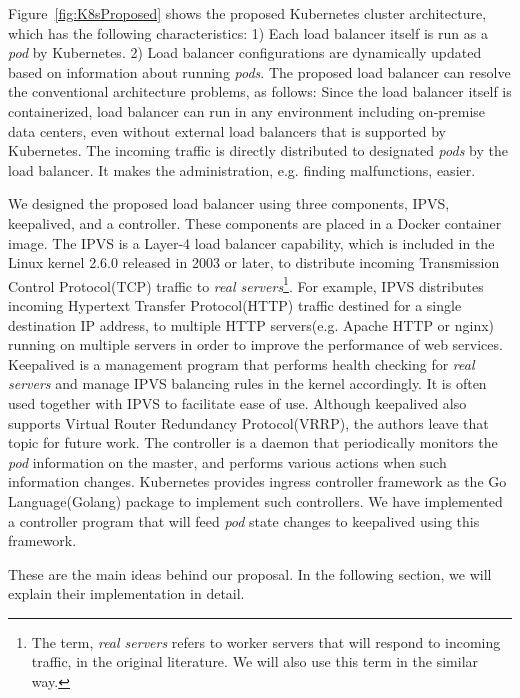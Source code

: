 Figure~\ref{fig:K8sProposed} shows the proposed  Kubernetes cluster architecture, 
which has the following characteristics:
1) Each load balancer itself is run as a {\em pod} by Kubernetes. 
2) Load balancer configurations are dynamically updated based on information about running {\em pods}.
The proposed load balancer can resolve the conventional architecture problems, as follows:
Since the load balancer itself is containerized, load balancer can run in any environment including on-premise data centers, 
even without external load balancers that is supported by Kubernetes.
The incoming traffic is directly distributed to designated {\em pods} by the load balancer. 
It makes the administration, e.g. finding malfunctions, easier.

We designed the proposed load balancer using three components, IPVS, keepalived, and a controller. 
These components are placed in a Docker container image.
The IPVS is a Layer-4 load balancer capability, which is included in the Linux kernel 2.6.0 released in 2003 or later, 
to distribute incoming Transmission Control Protocol(TCP) traffic to 
{\em real servers}\footnote{The term, {\em real servers} refers to worker servers that will respond to incoming traffic, 
in the original literature\cite{Zhang2000}. We will also use this term in the similar way.}\cite{Zhang2000}. 
For example, IPVS distributes incoming Hypertext Transfer Protocol(HTTP) traffic destined for a single destination IP address, 
to multiple HTTP servers(e.g. Apache HTTP or nginx) running on multiple servers in order to improve the performance of web services.
Keepalived is a management program that performs health checking for {\em real servers}
and manage IPVS balancing rules in the kernel accordingly.
It is often used together with IPVS to facilitate ease of use.
Although keepalived also supports Virtual Router Redundancy Protocol(VRRP)\cite{hinden2004virtual}, the authors leave that topic for future work.
The controller is a daemon that periodically monitors the {\em pod} information on the master, 
and performs various actions when such information changes.
Kubernetes provides ingress controller framework as the Go Language(Golang) package to implement such controllers. 
We have implemented a controller program that will feed {\em pod} state changes to keepalived 
using this framework. 

These are the main ideas behind our proposal. In the following section, we will explain their implementation in detail.

